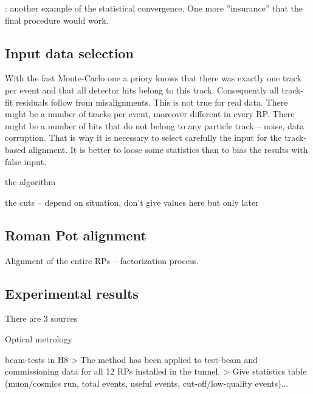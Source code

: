 
: another example of the statistical convergence. One more ''insurance'' that the final procedure would work.


\subsection{Input data selection}

With the fast Monte-Carlo one a priory knows that there was exactly one track per event and that all detector hits belong to this track. Consequently all track-fit residuals follow from misalignments. This is not true for real data. There might be a number of tracks per event, moreover different in every RP. There might be a number of hits that do not belong to any particle track -- noise, data corruption. That is why it is necessary to select carefully the input for the track-based alignment. It is better to loose some statistics than to bias the results with false input.

\> the algorithm

\> the cuts -- depend on situation, don't give values here but only later

\subsection{Roman Pot alignment}

Alignment of the entire RPs -- factorization process.



\subsection[al exp res]{Experimental results}

There are 3 sources

\> Optical metrology

\> beam-tests in H8
\>> The method has been applied to test-beam and commissioning data for all 12 RPs installed in the tunnel.
\>> Give statistics table (muon/cosmics run, total events, useful events, cut-off/low-quality events)...

